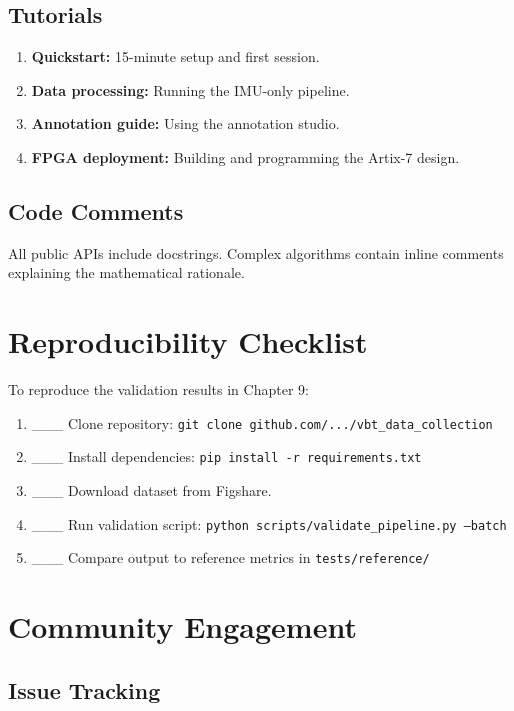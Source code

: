 \subsection{Tutorials}

\begin{enumerate}
    \item \textbf{Quickstart:} 15-minute setup and first session.
    \item \textbf{Data processing:} Running the IMU-only pipeline.
    \item \textbf{Annotation guide:} Using the annotation studio.
    \item \textbf{FPGA deployment:} Building and programming the Artix-7 design.
\end{enumerate}

\subsection{Code Comments}

All public APIs include docstrings. Complex algorithms contain inline comments explaining the mathematical rationale.

\section{Reproducibility Checklist}

To reproduce the validation results in Chapter 9:

\begin{enumerate}
    \item \_\_\_ Clone repository: \texttt{git clone github.com/.../vbt\_data\_collection}
    \item \_\_\_ Install dependencies: \texttt{pip install -r requirements.txt}
    \item \_\_\_ Download dataset from Figshare.
    \item \_\_\_ Run validation script: \texttt{python scripts/validate\_pipeline.py --batch}
    \item \_\_\_ Compare output to reference metrics in \texttt{tests/reference/}
\end{enumerate}

\section{Community Engagement}

\subsection{Issue Tracking}

